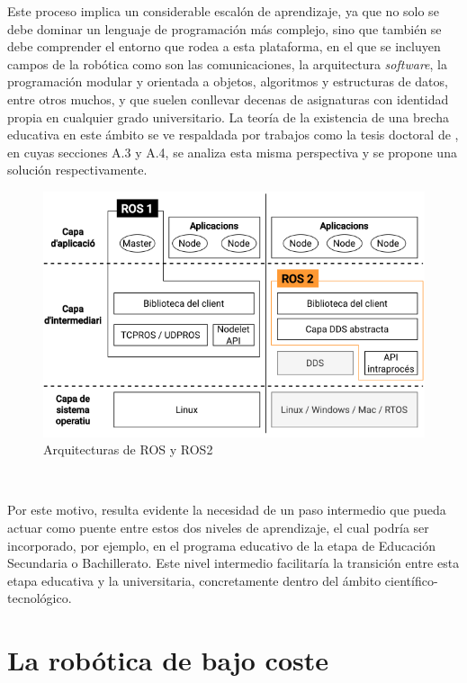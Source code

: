 Este proceso implica un considerable escalón de aprendizaje, ya que no solo se
debe dominar un lenguaje de programación más complejo, sino que también se debe
comprender el entorno que rodea a esta plataforma, en el que se incluyen campos
de la robótica como son las comunicaciones, la arquitectura \textit{software},
la programación modular y orientada a objetos, algoritmos y estructuras de
datos, entre otros muchos, y que suelen conllevar decenas de asignaturas con
identidad propia en cualquier grado universitario.
La teoría de la existencia de una brecha educativa en este ámbito se ve
respaldada por trabajos como la tesis doctoral de \cite{vega2018}, en cuyas
secciones A.3 y A.4, se analiza esta misma perspectiva y se propone una solución
respectivamente.

\begin{figure} [h!]
  \begin{center}
    \includegraphics[width=12cm]{figs/ROS_and_ROS2}
  \end{center}
  \caption{Arquitecturas de ROS y ROS2 \cite{ros_ros2}}
  \label{fig:ros}
\end{figure}\

Por este motivo, resulta evidente la necesidad de un paso intermedio que pueda
actuar como puente entre estos dos niveles de aprendizaje, el cual podría ser
incorporado, por ejemplo, en el programa educativo de la etapa de Educación
Secundaria o Bachillerato.
Este nivel intermedio facilitaría la transición entre esta etapa educativa y la
universitaria, concretamente dentro del ámbito científico-tecnológico.



\section{La robótica de bajo coste}
\label{sec:robotica_bajo_coste} %

